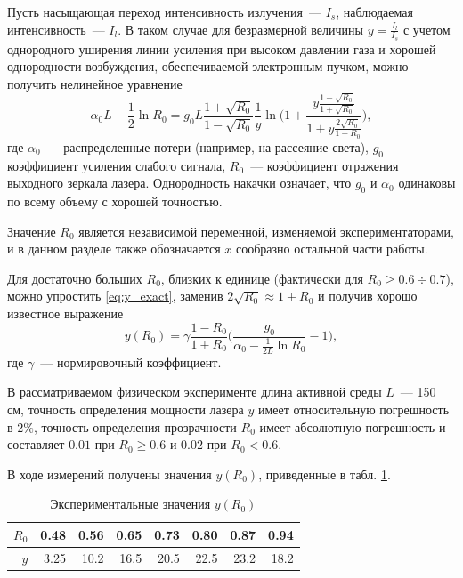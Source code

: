 \documentclass[tikz,10pt,a4paper]{article}
\begin{document}
Пусть насыщающая переход интенсивность излучения~--- $I_s$, наблюдаемая интенсивность~---
$I_l$. В таком случае для безразмерной величины $y = \frac{I_l}{I_s}$ с учетом однородного
уширения линии усиления при высоком давлении газа и хорошей однородности возбуждения,
обеспечиваемой электронным пучком, можно получить нелинейное уравнение \cite{champagne1982transient}
\begin{equation}
  \alpha_0 L - \frac{1}{2} \ln R_0 = g_0 L \frac{1 + \sqrt{R_0}}{1 - \sqrt{R_0}} \frac{1}{y} \ln \Big( 1 + \frac{y \frac{1 - \sqrt{R_0}}{1 + \sqrt{R_0}}}{1 + y \frac{2 \sqrt{R_0}}{1 - R_0}} \Big),
  \label{eq:y_exact}
\end{equation}
где $\alpha_0$~--- распределенные потери (например, на рассеяние света),
$g_0$~--- коэффициент усиления слабого сигнала, $R_0$~--- коэффициент отражения выходного
зеркала лазера. Однородность накачки означает, что $g_0$ и $\alpha_0$ одинаковы по
всему объему с хорошей точностью.

Значение $R_0$ является независимой переменной, изменяемой экспериментаторами, и в данном
разделе также обозначается $x$ сообразно остальной части работы.

Для достаточно больших $R_0$, близких к единице (фактически для $R_0 \geq 0.6 \div 0.7$),
можно упростить \eqref{eq:y_exact}, заменив $2 \sqrt{R_0} \approx 1 + R_0$ и получив
хорошо известное выражение\cite{champagne1982transient}
\begin{equation}
  y(R_0) = \gamma \frac{1 - R_0}{1 + R_0} \Big(\frac{g_0}{\alpha_0 - \frac{1}{2L} \ln R_0} - 1\Big),
  \label{eq:y_approx}
\end{equation}
где $\gamma$~--- нормировочный коэффициент.

В рассматриваемом физическом эксперименте длина активной среды $L$~--- 150 см,
точность определения мощности лазера $y$ имеет
относительную погрешность в $2\%$, точность определения прозрачности $R_0$ имеет
абсолютную погрешность и составляет $0.01$ при $R_0 \geq 0.6$ и $0.02$ при $R_0 < 0.6$.

В ходе измерений получены значения $y(R_0)$, приведенные в табл. \ref{tabl:measurements}.

\begin{table}[h]
  \caption{Экспериментальные значения $y(R_0)$}
  \centering
  \begin{tabular}{| r | r | r | r | r | r | r | r |}
	\hline
	$R_0$	&	0.48	&	0.56	&	0.65	&	0.73	&	0.80	&	0.87	&	0.94	\\ \hline
	$y$		&	3.25	&	10.2	&	16.5	&	20.5	&	22.5	&	23.2	&	18.2	\\ \hline
  \end{tabular}
  \label{tabl:measurements}
\end{table}
\end{document}
